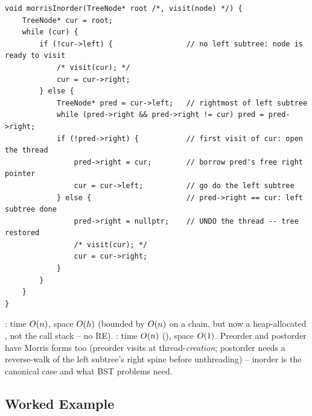 \begin{lstlisting}[caption={Morris inorder -- $\bigO{1}$ space; each \code{visit} is one line}, label={lst:c03-morris}]
void morrisInorder(TreeNode* root /*, visit(node) */) {
    TreeNode* cur = root;
    while (cur) {
        if (!cur->left) {                 // no left subtree: node is ready to visit
            /* visit(cur); */
            cur = cur->right;
        } else {
            TreeNode* pred = cur->left;   // rightmost of left subtree
            while (pred->right && pred->right != cur) pred = pred->right;
            if (!pred->right) {           // first visit of cur: open the thread
                pred->right = cur;        // borrow pred's free right pointer
                cur = cur->left;          // go do the left subtree
            } else {                      // pred->right == cur: left subtree done
                pred->right = nullptr;    // UNDO the thread -- tree restored
                /* visit(cur); */
                cur = cur->right;
            }
        }
    }
}
\end{lstlisting}
\begin{complexitybox}
: time $O(n)$, space $O(h)$ (bounded by $O(n)$ on
a chain, but now a heap-allocated , not the call stack -- no \textsf{RE}).
: time $O(n)$ (), space $O(1)$.
Preorder and postorder have Morris forms too (preorder visits at thread-\emph{creation};
postorder needs a reverse-walk of the left subtree's right spine before unthreading) --
inorder is the canonical case and what BST problems need.
\end{complexitybox}

\subsection{Worked Example}

